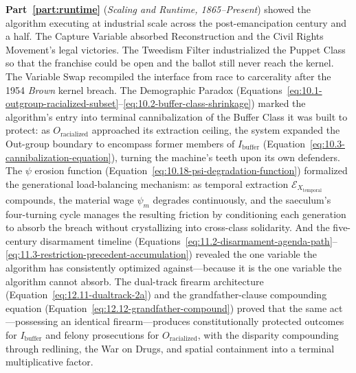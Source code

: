 \textbf{Part~\ref{part:runtime}} (\textit{Scaling and Runtime, 1865--Present}) showed the algorithm executing at industrial scale across the post-emancipation century and a half. The Capture Variable absorbed Reconstruction and the Civil Rights Movement's legal victories. The Tweedism Filter industrialized the Puppet Class so that the franchise could be open and the ballot still never reach the kernel. The Variable Swap recompiled the interface from race to carcerality after the 1954 \textit{Brown} kernel breach. The Demographic Paradox (Equations~\ref{eq:10.1-outgroup-racialized-subset}--\ref{eq:10.2-buffer-class-shrinkage}) marked the algorithm's entry into terminal cannibalization of the Buffer Class it was built to protect: as $O_{\text{racialized}}$ approached its extraction ceiling, the system expanded the Out-group boundary to encompass former members of $I_{\text{buffer}}$ (Equation~\ref{eq:10.3-cannibalization-equation}), turning the machine's teeth upon its own defenders. The $\psi$ erosion function (Equation~\ref{eq:10.18-psi-degradation-function}) formalized the generational load-balancing mechanism: as temporal extraction $\mathcal{E}_{X_{\text{temporal}}}$ compounds, the material wage $\psi_m$ degrades continuously, and the saeculum's four-turning cycle manages the resulting friction by conditioning each generation to absorb the breach without crystallizing into cross-class solidarity. And the five-century disarmament timeline (Equations~\ref{eq:11.2-disarmament-agenda-path}--\ref{eq:11.3-restriction-precedent-accumulation}) revealed the one variable the algorithm has consistently optimized against---because it is the one variable the algorithm cannot absorb. The dual-track firearm architecture (Equation~\ref{eq:12.11-dualtrack-2a}) and the grandfather-clause compounding equation (Equation~\ref{eq:12.12-grandfather-compound}) proved that the same act---possessing an identical firearm---produces constitutionally protected outcomes for $I_{\text{buffer}}$ and felony prosecutions for $O_{\text{racialized}}$, with the disparity compounding through redlining, the War on Drugs, and spatial containment into a terminal multiplicative factor.

